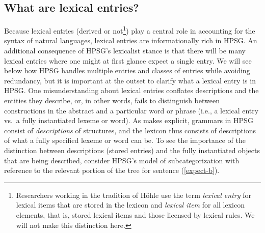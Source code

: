 \documentclass[output=paper
 	        ,biblatex
                ,babelshorthands
                ,newtxmath
                ,draftmode
                ,colorlinks, citecolor=brown
]{langscibook}
\begin{document}
\subsection{What are lexical entries?}


Because lexical entries (derived or not\footnote{%
Researchers working in the tradition of Höhle use the term \emph{lexical entry} for lexical items that are stored in the lexicon and \emph{lexical item} for all lexicon elements, that is, stored lexical items and those licensed by lexical rules. We will not make this distinction here.}) play a central role in accounting for the syntax of natural languages, lexical entries are informationally rich in HPSG. 
An additional consequence of HPSG's lexicalist stance is that there will be many lexical entries where one might at first glance expect a single entry. We will see below how HPSG handles multiple entries and classes of entries while avoiding redundancy, but it is important at the outset to clarify what a lexical entry is in HPSG. 
One misunderstanding about lexical entries conflates descriptions and the entities they describe, or, in other words, fails to distinguish between constructions in the abstract and a particular word or phrase (i.e., a lexical entry vs.\ a fully instantiated lexeme or word). 
As  makes explicit, grammars in HPSG consist of \emph{descriptions} of structures, and the lexicon thus consists of descriptions of what a fully specified lexeme or word can be. 
To see the importance of the distinction between descriptions (stored entries) and the fully instantiated objects that are being described, consider HPSG's model of subcategorization with reference to the relevant portion of the tree for sentence (\ref{expect-b}). 
\end{document}
